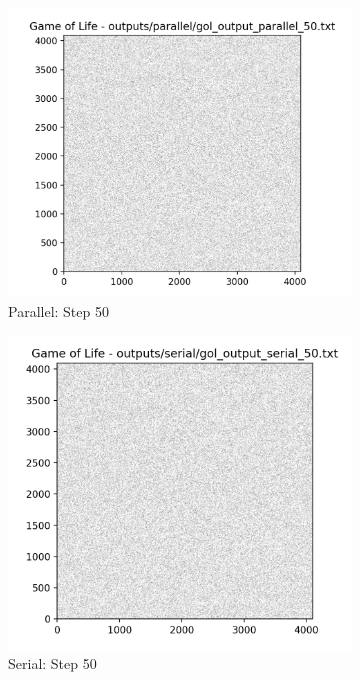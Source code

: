 \documentclass[a4paper,10pt]{article}
\begin{document}
\begin{figure}
\begin{subfigure}{0.4\textwidth}
    \includegraphics[width=\textwidth]{img/bonus/parallel_50.png}
    \caption{Parallel: Step 50}
\end{subfigure}
\hfill
\begin{subfigure}{0.4\textwidth}
    \includegraphics[width=\textwidth]{img/bonus/serial_50.png}
    \caption{Serial: Step 50}
\end{subfigure}
\hfill
\begin{subfigure}{0.4\textwidth}

\end{subfigure}
\end{figure}
\end{document}
